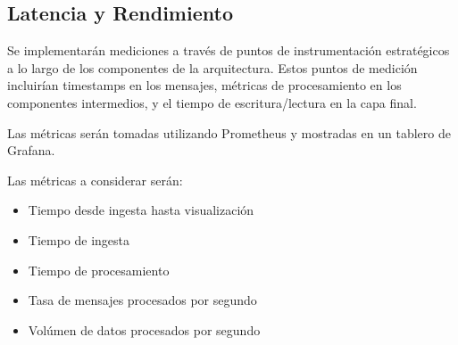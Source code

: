 \subsection{Latencia y Rendimiento}

Se implementarán mediciones a través de puntos de instrumentación estratégicos a lo largo de los componentes de la arquitectura.  
Estos puntos de medición incluirían timestamps en los mensajes, métricas de procesamiento en los componentes intermedios, y el tiempo de escritura/lectura en la capa final. 

Las métricas serán tomadas utilizando Prometheus y mostradas en un tablero de Grafana.

Las métricas a considerar serán:
\begin{itemize}
    \item Tiempo desde ingesta hasta visualización
    \item Tiempo de ingesta
    \item Tiempo de procesamiento 
    \item Tasa de mensajes procesados por segundo 
    \item Volúmen de datos procesados por segundo
\end{itemize}